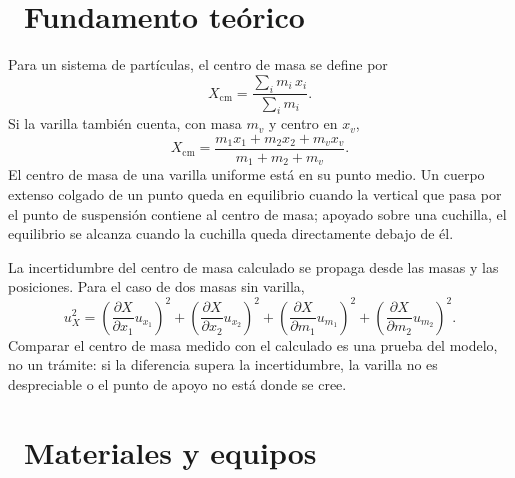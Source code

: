 \documentclass[11pt,a4paper]{article}
\newcommand{\iconotexto}[2]{\textcolor{cyanNeon}{\faIcon{#1}}~#2}
\begin{document}
\section{\iconotexto{book-open}{Fundamento teórico}}

Para un sistema de partículas, el centro de masa se define por
\[
  X_{\mathrm{cm}} = \frac{\sum_i m_i\,x_i}{\sum_i m_i}.
\]
Si la varilla también cuenta, con masa $m_v$ y centro en $x_v$,
\[
  X_{\mathrm{cm}} = \frac{m_1 x_1 + m_2 x_2 + m_v x_v}
                         {m_1 + m_2 + m_v}.
\]
El centro de masa de una varilla uniforme está en su punto medio. Un
cuerpo extenso colgado de un punto queda en equilibrio cuando la
vertical que pasa por el punto de suspensión contiene al centro de masa;
apoyado sobre una cuchilla, el equilibrio se alcanza cuando la cuchilla
queda directamente debajo de él.

La incertidumbre del centro de masa calculado se propaga desde las masas
y las posiciones. Para el caso de dos masas sin varilla,
\[
  u_{X}^2 = \left(\frac{\partial X}{\partial x_1}u_{x_1}\right)^2
          + \left(\frac{\partial X}{\partial x_2}u_{x_2}\right)^2
          + \left(\frac{\partial X}{\partial m_1}u_{m_1}\right)^2
          + \left(\frac{\partial X}{\partial m_2}u_{m_2}\right)^2.
\]
Comparar el centro de masa medido con el calculado es una prueba del
modelo, no un trámite: si la diferencia supera la incertidumbre, la
varilla no es despreciable o el punto de apoyo no está donde se cree.

\begin{center}
\par{}
\end{center}

\section{\iconotexto{box-open}{Materiales y equipos}}
\end{document}
